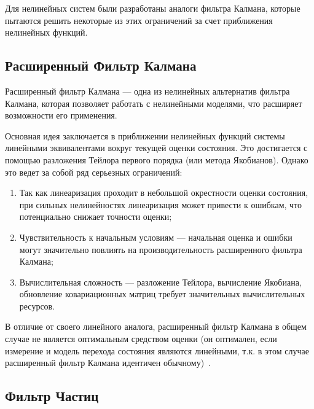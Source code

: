 Для нелинейных систем были разработаны аналоги фильтра Калмана, которые пытаются решить некоторые из этих ограничений за счет приближения нелинейных функций.

\subsection{Расширенный Фильтр Калмана}	
	
Расширенный фильтр Калмана --- одна из нелинейных альтернатив фильтра Калмана, которая позволяет работать с нелинейными моделями, что расширяет возможности его применения. 

Основная идея заключается в приближении нелинейных функций системы линейными эквивалентами вокруг текущей оценки состояния. Это достигается с помощью разложения Тейлора первого порядка (или метода Якобианов). Однако это ведет за собой ряд серьезных ограничений: 

\begin{enumerate}

	\item Так как линеаризация проходит в небольшой окрестности оценки состояния, при сильных нелинейностях линеаризация может привести к ошибкам, что потенциально снижает точности оценки;
	
	\item Чувствительность к начальным условиям --- начальная оценка и ошибки могут значительно повлиять на производительность расширенного фильтра Калмана;
	
	\item Вычислительная сложность --- разложение Тейлора, вычисление Якобиана, обновление ковариационных матриц требует значительных вычислительных ресурсов.
	
\end{enumerate}

В отличие от своего линейного аналога, расширенный фильтр Калмана в общем случае не является оптимальным средством оценки (он оптимален, если измерение и модель перехода состояния являются линейными, т.к. в этом случае расширенный фильтр Калмана идентичен обычному)~\cite{Mitzel2011, ExtendetKalmanFilter2023}. 
	
\subsection {Фильтр Частиц}

